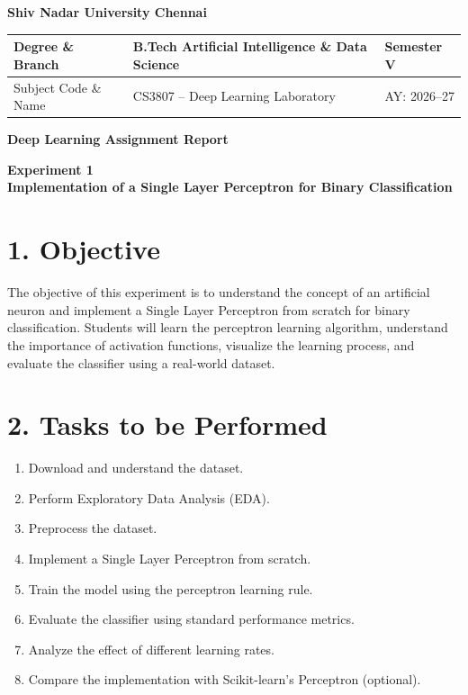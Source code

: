 \documentclass[11pt]{article}
\begin{document}
\begin{center}
\Large\textbf{Shiv Nadar University Chennai}\\[2mm]
\end{center}

\renewcommand{\arraystretch}{1.4}

\begin{tabular}{|p{3.5cm}|p{8cm}|p{2cm}|}
\hline
Degree \& Branch & B.Tech Artificial Intelligence \& Data Science & Semester V\\ \hline
Subject Code \& Name & CS3807 -- Deep Learning Laboratory & AY: 2026--27\\ \hline
\end{tabular}

\vspace{3mm}
\begin{center}
    {\Huge \textbf{Deep Learning Assignment Report }}
\end{center}

\begin{center}
\Large\textbf{Experiment 1}\\
\large\textbf{Implementation of a Single Layer Perceptron for Binary Classification}
\end{center}



\section*{1. Objective}

The objective of this experiment is to understand the concept of an artificial neuron and implement a Single Layer Perceptron from scratch for binary classification. Students will learn the perceptron learning algorithm, understand the importance of activation functions, visualize the learning process, and evaluate the classifier using a real-world dataset.


\section*{2. Tasks to be Performed}

\begin{enumerate}[leftmargin=*]
\item Download and understand the dataset.
\item Perform Exploratory Data Analysis (EDA).
\item Preprocess the dataset.
\item Implement a Single Layer Perceptron from scratch.
\item Train the model using the perceptron learning rule.
\item Evaluate the classifier using standard performance metrics.
\item Analyze the effect of different learning rates.
\item Compare the implementation with Scikit-learn's Perceptron (optional).
\end{enumerate}
\end{document}
